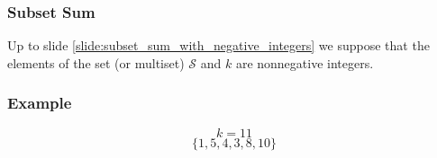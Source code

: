 \documentclass{beamer}
\begin{document}
\begin{frame}%
\frametitle{Subset Sum}

\begin{bclogo}[arrondi=0.1, logo=\bcattention]{}
Up to slide \ref{slide:subset_sum_with_negative_integers} we suppose that the elements of the set (or multiset) $\mathcal{S}$ and $k$ are nonnegative integers.
\end{bclogo}

\end{frame}

\begin{frame}%
\frametitle{Example}

\begin{center}
\large
$$
k = 11
$$
\large
$$
\{ 1, 5, 4, 3, 8, 10 \}
$$
\normalsize
\end{center}


\end{frame}
\end{document}
